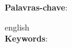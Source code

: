 \setlength{\absparsep}{18pt} %
\begin{resumo}
    \vspace{\onelineskip}
    \noindent
    \textbf{Palavras-chave}: %
\end{resumo}

\begin{resumo}[Abstract]
    \begin{otherlanguage*}{english}
	    \vspace{\onelineskip}
	    \noindent
	    \\
	    \textbf{Keywords}: %
    \end{otherlanguage*}
\end{resumo}